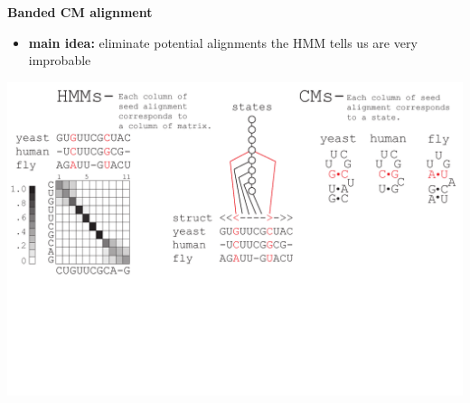 \documentclass[landscape]{slides}
\begin{document}
\begin{slide}
\begin{center}
\large
\textbf{Banded CM alignment}
\end{center}
\medskip
\small
\begin{itemize}
\item
\textbf{main idea:} eliminate potential alignments the HMM tells us are very improbable
\end{itemize}
\begin{center}
\includegraphics[width=8in]{figs/post_hmm_to_cm_map2_layer7}
\end{center}
\vfill
\end{slide}
\end{document}
